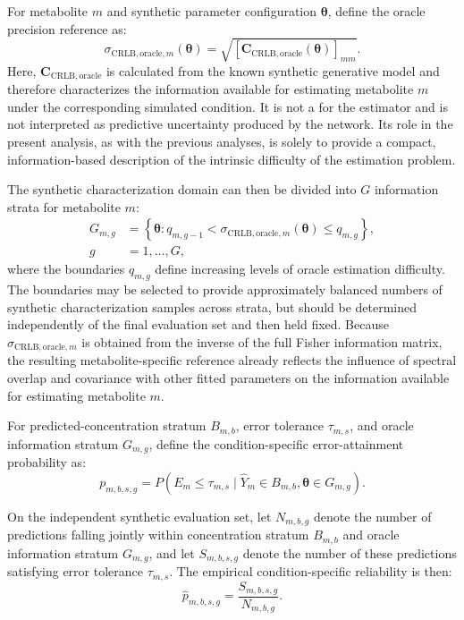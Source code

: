 For metabolite $m$ and synthetic parameter configuration $\boldsymbol{\theta}$, define the oracle precision reference as:
\begin{equation}
    \sigma_{\mathrm{CRLB,oracle},m}(\boldsymbol{\theta}) = \sqrt{ \left[ \mathbf{C}_{\mathrm{CRLB,oracle}} (\boldsymbol{\theta}) \right]_{mm} }.
\end{equation}%
Here, $\mathbf{C}_{\mathrm{CRLB,oracle}}$ is calculated from the known synthetic generative model and therefore characterizes the information available for estimating metabolite $m$ under the corresponding simulated condition. It is not a \CRLB for the \DL estimator and is not interpreted as predictive uncertainty produced by the network. Its role in the present analysis, as with the previous analyses, is solely to provide a compact, information-based description of the intrinsic difficulty of the estimation problem.

The synthetic characterization domain can then be divided into $G$ information strata for metabolite $m$:
\begin{equation}
\begin{aligned}
    G_{m,g} &= \left\{ \boldsymbol{\theta}: q_{m,g-1} < \sigma_{\mathrm{CRLB,oracle},m}(\boldsymbol{\theta}) \leq q_{m,g} \right\}, \\ g &= 1,\ldots,G,
\end{aligned}
\end{equation}
where the boundaries $q_{m,g}$ define increasing levels of oracle estimation difficulty. The boundaries may be selected to provide approximately balanced numbers of synthetic characterization samples across strata, but should be determined independently of the final evaluation set and then held fixed. Because $\sigma_{\mathrm{CRLB,oracle},m}$ is obtained from the inverse of the full Fisher information matrix, the resulting metabolite-specific reference already reflects the influence of spectral overlap and covariance with other fitted parameters on the information available for estimating metabolite $m$.

For predicted-concentration stratum $B_{m,b}$, error tolerance $\tau_{m,s}$, and oracle information stratum $G_{m,g}$, define the condition-specific error-attainment probability as:
\begin{equation}
    p_{m,b,s,g} = P\left( E_m \leq \tau_{m,s} \mid \hat{Y}_m \in B_{m,b}, \boldsymbol{\theta} \in G_{m,g} \right).
\end{equation}

On the independent synthetic evaluation set, let $N_{m,b,g}$ denote the number of predictions falling jointly within concentration stratum $B_{m,b}$ and oracle information stratum $G_{m,g}$, and let $S_{m,b,s,g}$ denote the number of these predictions satisfying error tolerance $\tau_{m,s}$. The empirical condition-specific reliability is then:
\begin{equation}
    \hat{p}_{m,b,s,g} = \frac{S_{m,b,s,g}}{N_{m,b,g}}.
\end{equation}

